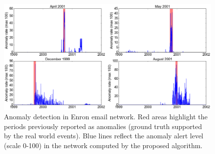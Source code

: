 \documentclass[]{article}
\begin{document}
\begin{figure}[t!]
	\centering
	\includegraphics[width=\columnwidth]{figures/enron.png}
	\caption{ Anomaly detection in Enron email network. Red areas highlight the periods previously reported as anomalies (ground truth supported by the real world events). Blue lines reflect the anomaly alert level (scale 0-100) in the network computed by the proposed algorithm.}
	\label{fig: enron}
\end{figure}
\end{document}
